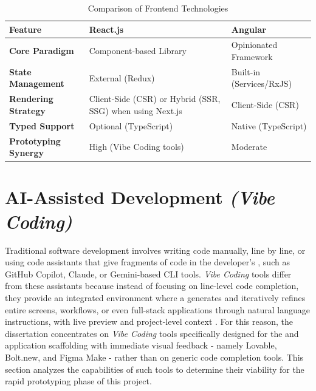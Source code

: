             \begin{table}[H]
                \centering
                \renewcommand{\arraystretch}{1.5} 
                \begin{tabularx}{\textwidth}{|l|>{\raggedright\arraybackslash}X|>{\raggedright\arraybackslash}X|}
                    \hline
                    \textbf{Feature} & \textbf{React.js} & \textbf{Angular} \\ \hline
                    \textbf{Core Paradigm} & Component-based Library & Opinionated Framework \\ \hline
                    \textbf{State Management} & External (Redux) & Built-in (Services/RxJS) \\ \hline
                    \textbf{Rendering Strategy} & Client-Side (CSR) or Hybrid (SSR, SSG) when using Next.js & Client-Side (CSR) \\ \hline
                    \textbf{Typed Support} & Optional (TypeScript) & Native (TypeScript) \\ \hline
                    \textbf{Prototyping Synergy} & High (Vibe Coding tools) & Moderate \\ \hline
                \end{tabularx}
                \caption{Comparison of Frontend Technologies}
                \label{tab:frontend_framework_comparison}
            \end{table} 

\section{AI-Assisted Development \textit{(Vibe Coding)}}
\label{sec:sota_ai_assited_dev}
    {
        Traditional software development involves writing code manually, line by line, or using code assistants that give fragments of code in the developer's , such as
        GitHub Copilot, Claude, or Gemini-based CLI tools.
        \textit{Vibe Coding} tools differ from these assistants because instead of focusing on line-level code completion, they provide an integrated environment where 
        a  generates and iteratively refines entire screens, workflows, or even full-stack applications through natural language instructions, with live preview and project-level context \cite{cloudflare-vibecoding-2025,devto-vibe-coding-2025}.
        For this reason, the dissertation concentrates on \textit{Vibe Coding} tools specifically designed for the  and application scaffolding with immediate visual feedback - namely
        Lovable, Bolt.new, and Figma Make - rather than on generic code completion tools.
        This section analyzes the capabilities of such tools to determine their viability for the rapid prototyping phase of this project.
    }       
            
